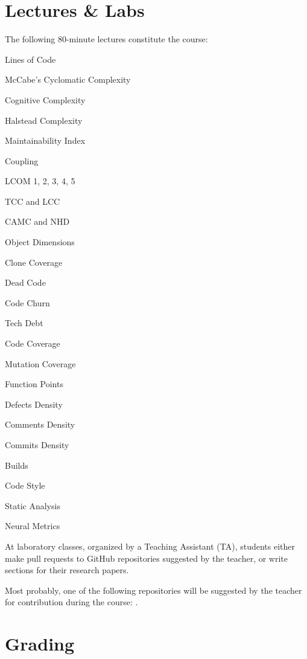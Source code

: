 \documentclass[nobrand,anonymous,nodate,nosecurity]{huawei}
\begin{document}
{\newpage
\section*{Lectures \& Labs}

The following 80-minute lectures constitute the course:

\begin{lectures}
    \item Lines of Code
    \item McCabe's Cyclomatic Complexity
    \item Cognitive Complexity
    \item Halstead Complexity
    \item Maintainability Index
    \item Coupling
    \item LCOM 1, 2, 3, 4, 5
    \item TCC and LCC
    \item CAMC and NHD
    \item Object Dimensions
    \item Clone Coverage
    \item Dead Code
    \item Code Churn
    \item Tech Debt
    \item Code Coverage
    \item Mutation Coverage
    \item Function Points
    \item Defects Density
    \item Comments Density
    \item Commits Density
    \item Builds
    \item Code Style
    \item Static Analysis
    \item Neural Metrics
\end{lectures}

At laboratory classes, organized by a Teaching Assistant (TA),
students either make pull requests to
GitHub repositories suggested by the teacher, or write sections
for their research papers.

Most probably, one of the following repositories will be suggested
by the teacher for contribution during the course:
\repositories{}.

\newpage
\section*{Grading}

}
\end{document}
